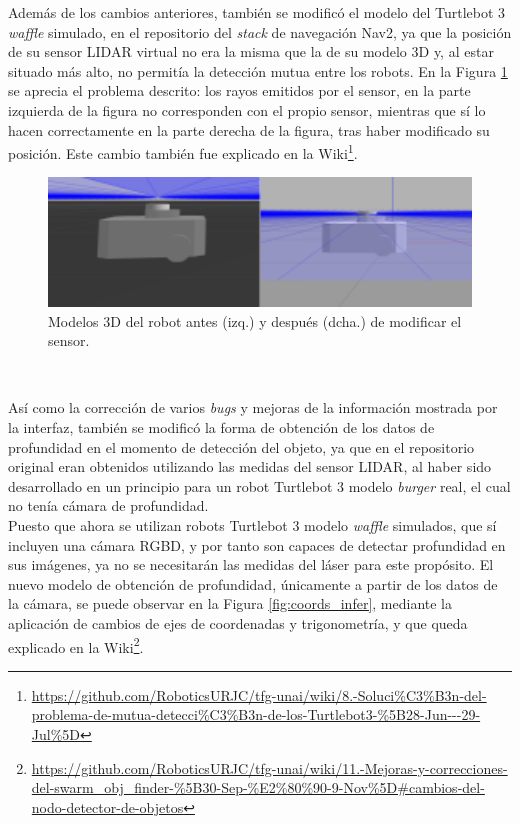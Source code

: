 Además de los cambios anteriores, también se modificó el modelo del Turtlebot 3
\textit{waffle} simulado, en el repositorio del \textit{stack} de navegación
Nav2, ya que la posición de su sensor LIDAR virtual no era la misma que la de su
modelo 3D y, al estar situado más alto, no permitía la detección mutua entre los
robots.
En la Figura \ref{fig:mutua_deteccion} se aprecia el problema descrito: los
rayos emitidos por el sensor, en la parte izquierda de la figura no corresponden
con el propio sensor, mientras que sí lo hacen correctamente en la parte derecha
de la figura, tras haber modificado su posición.
Este cambio también fue explicado en la Wiki\footnote{
\url{https://github.com/RoboticsURJC/tfg-unai/wiki/8.-Soluci\%C3\%B3n-del-problema-de-mutua-detecci\%C3\%B3n-de-los-Turtlebot3-\%5B28-Jun---29-Jul\%5D}}.

\begin{figure} [h!]
  \begin{center}
    \includegraphics[width=12cm]{figs/turtlebot_model_mods}
  \end{center}
  \caption{Modelos 3D del robot antes (izq.) y después (dcha.) de modificar el sensor.}
  \label{fig:mutua_deteccion}
\end{figure}\

Así como la corrección de varios \textit{bugs} y mejoras de la información
mostrada por la interfaz, también se modificó la forma de obtención de los datos
de profundidad en el momento de detección del objeto, ya que en el repositorio
original eran obtenidos utilizando las medidas del sensor LIDAR, al haber sido
desarrollado en un principio para un robot Turtlebot 3 modelo \textit{burger}
real, el cual no tenía cámara de profundidad.
\\

Puesto que ahora se utilizan robots Turtlebot 3 modelo \textit{waffle}
simulados, que sí incluyen una cámara RGBD, y por tanto son capaces de detectar
profundidad en sus imágenes, ya no se necesitarán las medidas del láser para
este propósito.
El nuevo modelo de obtención de profundidad, únicamente a partir de los datos de
la cámara, se puede observar en la Figura \ref{fig:coords_infer}, mediante la
aplicación de cambios de ejes de coordenadas y trigonometría, y que queda
explicado en la Wiki\footnote{
\url{https://github.com/RoboticsURJC/tfg-unai/wiki/11.-Mejoras-y-correcciones-del-swarm\_obj\_finder-\%5B30-Sep-\%E2\%80\%90-9-Nov\%5D\#cambios-del-nodo-detector-de-objetos}}.
\\

